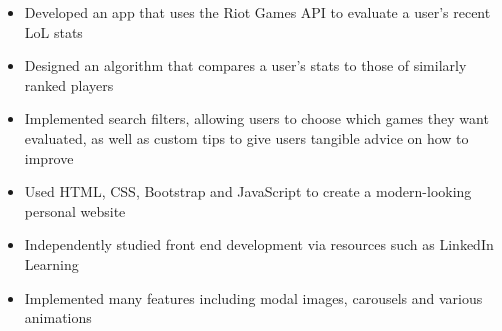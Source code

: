 \documentclass[10pt,a4paper,ragged2e,withhyper]{altacv}
\begin{document}
\begin{paracol}{2}
\divider

\begin{itemize}
    \item Developed an app that uses the Riot Games API to evaluate a user's recent LoL stats
    \item Designed an algorithm that compares a user's stats to those of similarly ranked players
    \item Implemented search filters, allowing users to choose which games they want evaluated, as well as custom tips to give users tangible advice on how to improve
\end{itemize}

\divider

\begin{itemize}
    \item Used HTML, CSS, Bootstrap and JavaScript to create a modern-looking personal website
    \item Independently studied front end development via resources such as LinkedIn Learning
    \item Implemented many features including modal images, carousels and various animations
\end{itemize}

\switchcolumn

\\

\medskip
\divider


\\

\medskip
\divider

\\

\medskip



\end{paracol}
\end{document}
